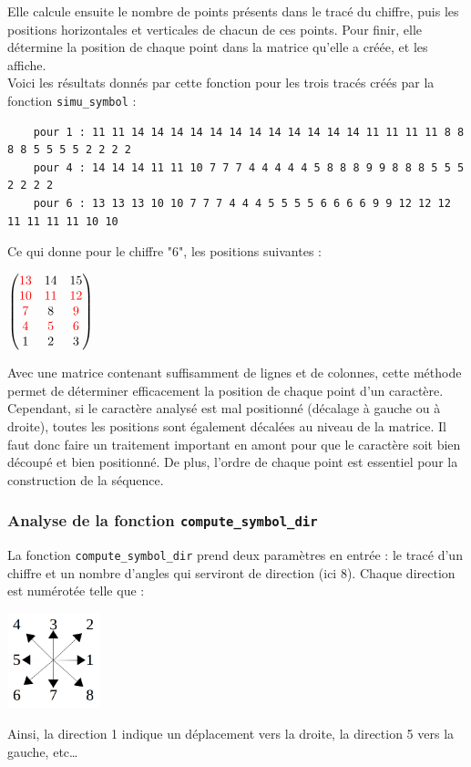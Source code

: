 Elle calcule ensuite le nombre de points présents dans le tracé du chiffre, puis les positions horizontales et verticales de chacun de ces points. Pour finir, elle détermine la position de chaque point dans la matrice qu'elle a créée, et les affiche.\\

Voici les résultats donnés par cette fonction pour les trois tracés créés par la fonction \texttt{simu\_symbol} :
\begin{lstlisting}
	pour 1 : 11 11 14 14 14 14 14 14 14 14 14 14 14 14 11 11 11 11 8 8 8 8 5 5 5 5 2 2 2 2 
	pour 4 : 14 14 14 11 11 10 7 7 7 4 4 4 4 4 5 8 8 8 9 9 8 8 8 5 5 5 2 2 2 2 
	pour 6 : 13 13 13 10 10 7 7 7 4 4 4 5 5 5 5 6 6 6 6 9 9 12 12 12 11 11 11 11 10 10 
\end{lstlisting}
Ce qui donne pour le chiffre "6", les positions suivantes :
\begin{center}
	$\begin{pmatrix}
		 \textcolor{red}{13} & 14 & 15 \\
		\textcolor{red}{10} & \textcolor{red}{11} & \textcolor{red}{12} \\
		\textcolor{red}{7} & 8 & \textcolor{red}{9} \\
		\textcolor{red}{4} & \textcolor{red}{5} & \textcolor{red}{6} \\
		1 & 2 & 3
	\end{pmatrix}$
\end{center}

Avec une matrice contenant suffisamment de lignes et de colonnes, cette méthode permet de déterminer efficacement la position de chaque point d'un caractère. Cependant, si le caractère analysé est mal positionné (décalage à gauche ou à droite), toutes les positions sont également décalées au niveau de la matrice. Il faut donc faire un traitement important en amont pour que le caractère soit bien découpé et bien positionné. De plus, l'ordre de chaque point est essentiel pour la construction de la séquence.

\subsubsection*{Analyse de la fonction \texttt{compute\_symbol\_dir}}
La fonction \texttt{compute\_symbol\_dir} prend deux paramètres en entrée : le tracé d'un chiffre et un nombre d'angles qui serviront de direction (ici 8). Chaque direction est numérotée telle que :
\begin{center}
	\includegraphics[width=0.20\textwidth]{Figures/direction.jpg}
\end{center}
Ainsi, la direction 1 indique un déplacement vers la droite, la direction 5 vers la gauche, etc\dots \\

